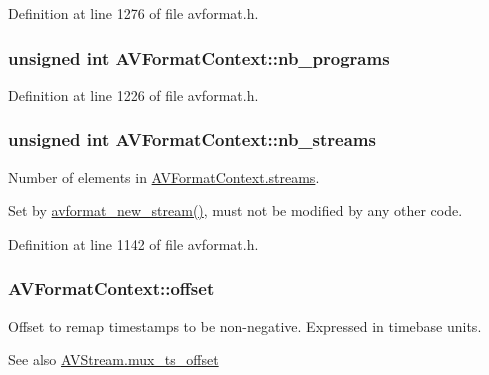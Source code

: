 Definition at line 1276 of file avformat.\+h.

\subsubsection[{\texorpdfstring{nb\+\_\+programs}{nb_programs}}]{\setlength{\rightskip}{0pt plus 5cm}unsigned {\bf int} A\+V\+Format\+Context\+::nb\+\_\+programs}\hypertarget{struct_a_v_format_context_a58c8c4d0ea974e0fcb0ce06fb1174f9f}{}\label{struct_a_v_format_context_a58c8c4d0ea974e0fcb0ce06fb1174f9f}


Definition at line 1226 of file avformat.\+h.

\subsubsection[{\texorpdfstring{nb\+\_\+streams}{nb_streams}}]{\setlength{\rightskip}{0pt plus 5cm}unsigned {\bf int} A\+V\+Format\+Context\+::nb\+\_\+streams}\hypertarget{struct_a_v_format_context_a0b748d924898b08b89ff4974afd17285}{}\label{struct_a_v_format_context_a0b748d924898b08b89ff4974afd17285}
Number of elements in \hyperlink{struct_a_v_format_context_acfefb6b6cf21e87a0dcbd1a547ba2348}{A\+V\+Format\+Context.\+streams}.

Set by \hyperlink{group__lavf__core_gadcb0fd3e507d9b58fe78f61f8ad39827}{avformat\+\_\+new\+\_\+stream()}, must not be modified by any other code. 

Definition at line 1142 of file avformat.\+h.

\subsubsection[{\texorpdfstring{offset}{offset}}]{ A\+V\+Format\+Context\+::offset}\hypertarget{struct_a_v_format_context_af5376f05f8adb610e57095b4b0705512}{}\label{struct_a_v_format_context_af5376f05f8adb610e57095b4b0705512}
Offset to remap timestamps to be non-\/negative. Expressed in timebase units. \begin{DoxySeeAlso}{See also}
\hyperlink{struct_a_v_stream_ae0598c5dc8ff45ac6cb56a7a23847a37}{A\+V\+Stream.\+mux\+\_\+ts\+\_\+offset} 
\end{DoxySeeAlso}


